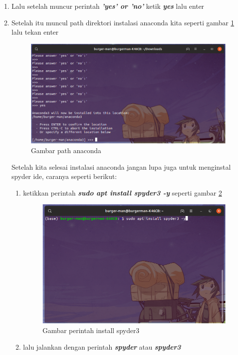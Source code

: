 \begin{enumerate}
\item Lalu setelah muncur perintah \textbf{\textit{'yes' or 'no'}} ketik \textbf{\textit{yes}} lalu enter

\item Setelah itu muncul path direktori instalasi anaconda kita seperti gambar \ref{enterpath} lalu tekan enter
\begin{figure}[H]
\centering
\includegraphics[width=1\textwidth]{figures/enterpath.png}
\caption{Gambar path anaconda}
\label{enterpath}
\end{figure}

Setelah kita selesai instalasi anaconda jangan lupa juga untuk menginstal spyder ide, caranya seperti berikut:
\begin{enumerate}

\item ketikkan perintah \textbf{\textit{sudo apt install spyder3 -y}} seperti gambar \ref{installspyder3}
\begin{figure}[H]
\centering
\includegraphics[width=1\textwidth]{figures/installspyder3.png}
\caption{Gambar perintah install spyder3}
\label{installspyder3}
\end{figure}

\item lalu jalankan dengan perintah \textbf{\textit{spyder}} atau \textbf{\textit{spyder3}}
\end{enumerate}

\end{enumerate}

